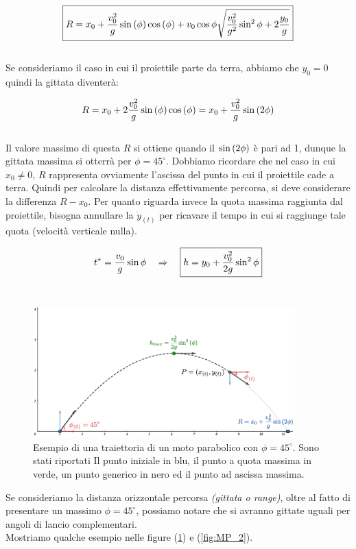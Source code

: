 \begin{equation}
    \boxed{R = x_0 + \frac{v_0^2}{g}\sin\left(\phi\right)\cos\left(\phi\right) +
    v_0\cos\phi\sqrt{\frac{v_0^2}{g^2}\sin^2\phi+2\frac{y_0}g}}
\label{eq:range}
\end{equation}
\\
Se consideriamo il caso in cui il proiettile parte da terra,
abbiamo che $y_0 = 0$ quindi la gittata diventerà:

\begin{equation}
    R = x_0 +2\frac{v_0^2}{g}\sin\left(\phi\right)\cos\left(\phi\right) = x_0 + \frac{v_0^2}{g}\sin\left(2\phi\right)
\label{eq:range_0}
\end{equation}
\\
Il valore massimo di questa $R$ si ottiene quando il $\sin\left(2\phi\right)$ è
pari ad 1, dunque la gittata massima si otterrà per $\phi = 45^\circ$.
Dobbiamo ricordare che nel caso in cui $x_0\ne0$, $R$ rappresenta
ovviamente l'ascissa del punto in cui il proiettile cade a terra.
Quindi per calcolare la distanza effettivamente percorsa, si deve
considerare la differenza $R-x_0$.
Per quanto riguarda invece la quota massima raggiunta dal proiettile,
bisogna annullare la $\dot y_{(t)}$ per ricavare il tempo in cui si
raggiunge tale quota (velocità verticale nulla).

\begin{equation}
    t^* = \frac{v_0}{g}\sin\phi\quad\Rightarrow\quad\boxed{h = y_0 + \frac{v_0^2}{2g}\sin^2\phi}
\label{eq:h_max}
\end{equation}
\\
\begin{figure}[h]
        \includegraphics[width=0.9\textwidth]{images/MP1.png} 
        \caption{Esempio di una traiettoria di un moto parabolico con $\phi = 45^\circ$.
        Sono stati riportati Il punto iniziale in blu, il punto a quota
        massima in verde, un punto generico in nero ed il punto ad ascissa
        massima.}
\label{fig:MP}
\end{figure}
Se consideriamo la distanza orizzontale percorsa \emph{(gittata o range)}, oltre
al fatto di presentare un massimo $\phi = 45^\circ$, possiamo notare che si avranno
gittate uguali per angoli di lancio complementari.\\
Mostriamo qualche esempio nelle figure (\ref{fig:MP}) e (\ref{fig:MP_2}).

